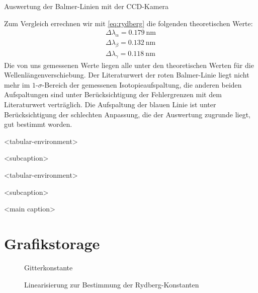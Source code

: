 \documentclass[11pt, a4paper]{article}
\numberwithin{equation}{section}
\begin{document}
\begin{table}[h]
\centering

\caption{Auswertung der Balmer-Linien mit der CCD-Kamera}
\label{tab:balmer_ccd_auswertung}
\end{table}
Zum Vergleich errechnen wir mit \eqref{eq:rydberg} die folgenden theoretischen Werte:
\begin{align}
\Delta\lambda_\alpha=\SI{0.179}{\nano\metre}\\
\Delta\lambda_\beta=\SI{0.132}{\nano\metre}\\
\Delta\lambda_\gamma=\SI{0.118}{\nano\metre}
\end{align}
Die von uns gemessenen Werte liegen alle unter den theoretischen Werten für die Wellenlängenverschiebung.
Der Literaturwert der roten Balmer-Linie liegt nicht mehr im $1$-$\sigma$-Bereich der gemessenen Isotopieaufspaltung, die anderen beiden Aufspaltungen sind unter Berücksichtigung der Fehlergrenzen mit dem Literaturwert verträglich.
Die Aufspaltung der blauen Linie ist unter Berücksichtigung der schlechten Anpassung, die der Auswertung zugrunde liegt, gut bestimmt worden.
\clearpage


\clearpage

\begin{table}
\centering
\begin{subtable}{0.5\textwidth}
\centering

<tabular-environment>

\caption{<subcaption>}
\end{subtable}%
\begin{subtable}{0.5\textwidth}
\centering

<tabular-environment>

\caption{<subcaption>}
\end{subtable}

\caption{<main caption>}
\end{table}

\section{Grafikstorage}

\begin{figure}
\centering

\caption{Gitterkonstante}
\label{fig:gitterkonstante}
\end{figure}

\clearpage

\begin{figure}
	\centering
	
	\caption{Linearisierung zur Bestimmung der Rydberg-Konstanten}
	\label{fig:rydberg_balmer}
\end{figure}
\end{document}
